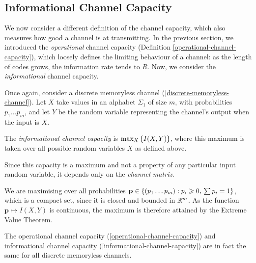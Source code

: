 \documentclass{article}
\begin{document}

\subsection{Informational Channel Capacity}
\label{section-error-control-informational-capacity}

We now consider a different definition of the channel capacity,
which also measures how good a channel is at transmitting.
In the previous section, we introduced the \textit{operational} channel capacity
(Definition \ref{operational-channel-capacity}),
which loosely defines the limiting behaviour of a channel:
as the length of codes grows, the information rate tends to $R$.
Now, we consider the \textit{informational} channel capacity.

\begin{definition}
	\label{informational-channel-capacity}
	Once again, consider a discrete memoryless channel
	(\ref{discrete-memoryless-channel}).
	Let $X$ take values in an alphabet $\Sigma_1$ of size $m$,
	with probabilities $p_1 \dots p_m$,
	and let $Y$ be the random variable
	representing the channel's output when the input is $X$.
	
    The \textit{informational channel capacity} is $\max_X \left\lbrace I(X, Y) \right\rbrace$, where
    this maximum is taken over all possible random variables $X$ as defined above.
\end{definition}

\begin{note}
	Since this capacity is a maximum
	and not a property of any particular input random variable,
	it depends only on the \textit{channel matrix}.
\end{note}

\begin{note}
	We are maximising over all probabilities
	$\mathbf p \in \left\lbrace (p_1 \dots p_m) : p_i \geqslant 0, \, \sum p_i = 1 \right\rbrace$,
	which is a compact set, since it is closed and bounded in $\mathbb{R}^m$.
	As the function $\mathbf p \mapsto I(X, Y)$ is continuous,
	the maximum is therefore attained by the Extreme Value Theorem.
\end{note}

\begin{theorem}
	\label{shannon-noisy-coding-theorem}
    The operational channel capacity (\ref{operational-channel-capacity})
    and informational channel capacity (\ref{informational-channel-capacity})
    are in fact the same for all discrete memoryless channels.
\end{theorem}
\end{document}
